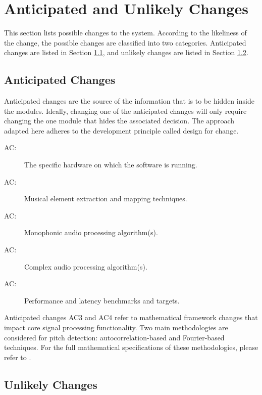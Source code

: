 \documentclass[12pt, titlepage]{article}
\newcounter{acnum}
\newcommand{\actheacnum}{AC\theacnum}
\begin{document}
\section{Anticipated and Unlikely Changes} \label{SecChange}

This section lists possible changes to the system. According to the likeliness
of the change, the possible changes are classified into two
categories. Anticipated changes are listed in Section \ref{SecAchange}, and
unlikely changes are listed in Section \ref{SecUchange}.

\subsection{Anticipated Changes} \label{SecAchange}

Anticipated changes are the source of the information that is to be hidden
inside the modules. Ideally, changing one of the anticipated changes will only
require changing the one module that hides the associated decision. The approach
adapted here adheres to the development principle called design for change.

\begin{description}
  \item[ \actheacnum \label{acHardware}:] The specific hardware on which the software is running.
  \item[ \actheacnum \label{acExtractionMapping}:] Musical element extraction and mapping techniques.
  \item[ \actheacnum \label{acMonophonic}:] Monophonic audio processing algorithm(s).
  \item[ \actheacnum \label{acComplex}:] Complex audio processing algorithm(s).
  \item[ \actheacnum \label{acPerformance}:] Performance and latency benchmarks and targets.
\end{description}

\noindent Anticipated changes AC3 and AC4 refer to mathematical framework changes that impact core signal processing functionality. 
Two main methodologies are considered for pitch detection: autocorrelation-based and Fourier-based techniques. For the full 
mathematical specifications of these methodologies, please refer to .
  
\subsection{Unlikely Changes} \label{SecUchange}
\end{document}
